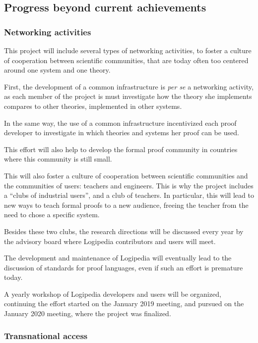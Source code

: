\subsection{Progress beyond current achievements}

\subsubsection{Networking activities}
This project will include several types of networking activities, to
foster a culture of cooperation between scientific communities, that
are today often too centered around one system and one theory.

First, the development of a common infrastructure is {\em per se} a
networking activity, as each member of the project is must investigate
how the theory she implements compares to other theories, implemented
in other systems.

In the same way, the use of a common infrastructure incentivized each
proof developer to investigate in which theories and systems her proof
can be used.

This effort will also help to develop the formal proof community in
countries where this community is still small.

This will also foster a culture of cooperation between scientific
communities and the communities of users: teachers and engineers.
This is why the project includes a ``clubs of industrial users'', and
a club of teachers. In particular, this will lead to new ways to teach
formal proofs to a new audience, freeing the teacher from the need to
chose a specific system.

Besides these two clubs, the research directions will be discussed
every year by the advisory board where {\sc Logipedia} contributors
and users will meet.

The development and maintenance of {\sc Logipedia} will eventually lead
to the discussion of standards for proof languages, even if such an
effort is premature today.

A yearly workshop of {\sc Logipedia} developers and users will be
organized, continuing the effort started on the January 2019 meeting,
and pursued on the January 2020 meeting, where the project was
finalized.

\subsubsection{Transnational access}

